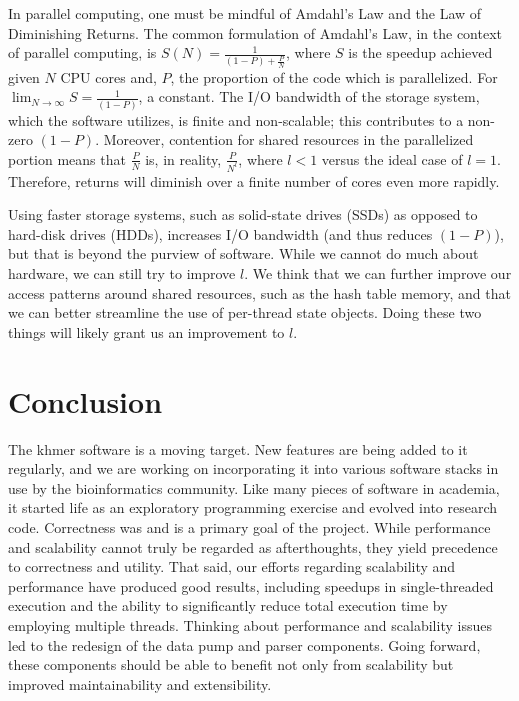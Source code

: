 \documentclass{article}
\begin{document}
In parallel computing, one must be mindful of Amdahl's Law \citep{web:Amdahl}
and the Law of Diminishing Returns. The common formulation of Amdahl's Law, in
the context of parallel computing, is $S(N) = \frac{1}{(1 - P) + \frac{P}{N}}$,
where $S$ is the speedup achieved given $N$ CPU cores and, $P$, the proportion
of the code which is parallelized.  For $\lim_{N\to\infty} S = \frac{1}{(1 -
P)}$, a constant.  The I/O bandwidth of the storage system, which the software
utilizes, is finite and non-scalable; this contributes to a non-zero $(1 - P)$.
Moreover, contention for shared resources in the parallelized portion means
that $\frac{P}{N}$ is, in reality, $\frac{P}{N^l}$, where $l < 1$ versus the
ideal case of $l = 1$.  Therefore, returns will diminish over a finite number
of cores even more rapidly.

Using faster storage systems, such as solid-state drives (SSDs) as opposed to
hard-disk drives (HDDs), increases I/O bandwidth (and thus reduces $(1 - P)$),
but that is beyond the purview of software. While we cannot do much about
hardware, we can still try to improve $l$. We think that we can further improve
our access patterns around shared resources, such as the hash table memory, and
that we can better streamline the use of per-thread state objects. Doing these
two things will likely grant us an improvement to $l$.

\section{Conclusion}

The khmer software is a moving target. New features are being added to it
regularly, and we are working on incorporating it into various software stacks
in use by the bioinformatics community. Like many pieces of software in
academia, it started life as an exploratory programming exercise and evolved
into research code.  Correctness was and is a primary goal of the project.
While performance and scalability cannot truly be regarded as afterthoughts,
they yield precedence to correctness and utility. That said, our efforts
regarding scalability and performance have produced good results, including
speedups in single-threaded execution and the ability to significantly reduce
total execution time by employing multiple threads. Thinking about performance
and scalability issues led to the redesign of the data pump and parser
components. Going forward, these components should be able to benefit not only
from scalability but improved maintainability and extensibility.
\end{document}
